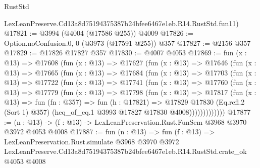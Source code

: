 \begin{lexlean}{RustStd}
\begin{coremodule}
    LexLeanPreserve.Cd13a8d75194375387b24bfee6467e1eb.R14.RustStd.fun11)
@17821 := @3994 (@4004 (@17586 @255)) @4009
@17826 := Option.noConfusion.{0, 0} (@3973 (@17591 @255)) @357
@17827 := @2156 @357
@17829 := @17826 @17827 @357
@17830 := @4007 @4053
@17869 := fun (x : @13) =>
  @17608
    (fun (x : @13) =>
    @17627
      (fun (x : @13) =>
      @17646
        (fun (x : @13) =>
        @17665
          (fun (x : @13) =>
          @17684
            (fun (x : @13) =>
            @17703
              (fun (x : @13) =>
              @17722
                (fun (x : @13) =>
                @17741
                  (fun (x : @13) =>
                  @17760
                    (fun (x : @13) =>
                    @17779
                      (fun (x : @13) =>
                      @17798
                        (fun (x : @13) =>
                        @17817
                          (fun (x : @13) =>
                          fun (fn : @357) =>
                          fun (h : @17821) =>
                          @17829
                            @17830
                            (Eq.refl.{2} (Sort 1) @357)
                            (heq_of_eq.{1} @3993 @17827 @17830 @4008)))))))))))))
@17877 := (n : @13) -> (f : @13) -> LexLeanPreservation.Rust.FunSem @3968 @3970 @3972 @4053 @4008
@17887 := fun (n : @13) =>
  fun (f : @13) =>
  LexLeanPreservation.Rust.simulate
    @3968
    @3970
    @3972
    LexLeanPreserve.Cd13a8d75194375387b24bfee6467e1eb.R14.RustStd.crate_ok
    @4053
    @4008
\end{coremodule}
\end{lexlean}
